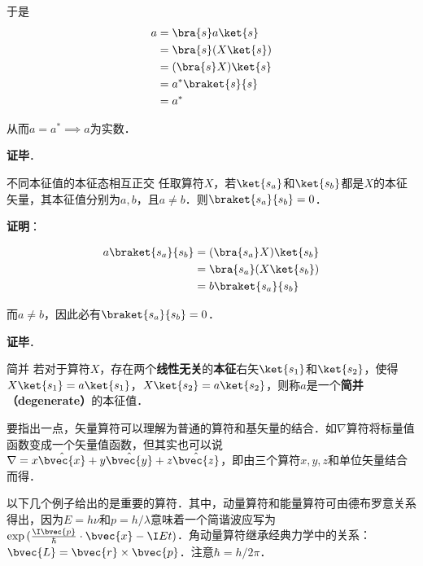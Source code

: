于是
\begin{equation}\label{QMPrcp_eq5}
\begin{aligned}
a&=\bra{s}a\ket{s}\\
&=\bra{s}(X\ket{s})\\
&=(\bra{s}X)\ket{s}\\
&=a^*\braket{s}{s}\\
&=a^*
\end{aligned}
\end{equation}

从而$a=a^*\implies a$为实数．

\textbf{证毕}．


\begin{theorem}{不同本征值的本征态相互正交}\label{QMPrcp_the3}
任取算符$X$，若$\ket{s_a}$和$\ket{s_b}$都是$X$的本征矢量，其本征值分别为$a,b$，且$a\neq b$．则$\braket{s_a}{s_b}=0$．
\end{theorem}

\textbf{证明}：

\begin{equation}
\begin{aligned}
a\braket{s_a}{s_b}&=(\bra{s_a}X)\ket{s_b}\\
&=\bra{s_a}(X\ket{s_b})\\
&=b\braket{s_a}{s_b}
\end{aligned}
\end{equation}

而$a\neq b$，因此必有$\braket{s_a}{s_b}=0$．

\textbf{证毕}．



\begin{definition}{简并}\label{QMPrcp_def16}
若对于算符$X$，存在两个\textbf{线性无关}的\textbf{本征}右矢$\ket{s_1}$和$\ket{s_2}$，使得$X\ket{s_1}=a\ket{s_1}$，$X\ket{s_2}=a\ket{s_2}$，则称$a$是一个\textbf{简并（degenerate）}的本征值．
\end{definition}






要指出一点，矢量算符可以理解为普通的算符和基矢量的结合．如$\nabla$算符将标量值函数变成一个矢量值函数，但其实也可以说$\nabla=x\hat{\bvec{x}}+y\hat{\bvec{y}}+z\hat{\bvec{z}}$，即由三个算符$x, y, z$和单位矢量结合而得．



以下几个例子给出的是重要的算符．其中，动量算符和能量算符可由德布罗意关系得出，因为$E=h\nu$和$p=h/\lambda$意味着一个简谐波应写为$\exp{(\frac{\I \bvec{p}}{\hbar}\cdot\bvec{x}-\I Et)}$．角动量算符继承经典力学中的关系：$\bvec{L}=\bvec{r}\times\bvec{p}$．注意$\hbar=h/2\pi$．

